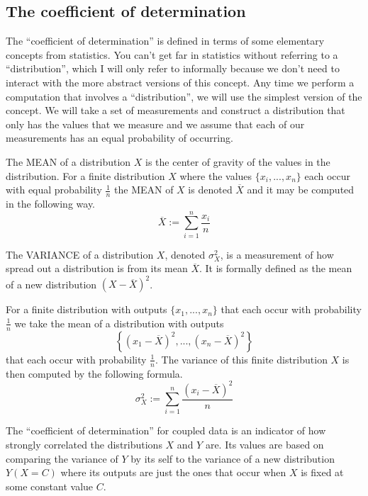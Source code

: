 \subsection{The coefficient of determination}

The ``coefficient of determination'' is defined in terms of some elementary concepts from statistics. You can't get far in statistics without referring to a ``distribution'', which I will only refer to informally because we don't need to interact with the more abstract versions of this concept. Any time we perform a computation that involves a ``distribution'', we will use the simplest version of the concept. We will take a set of measurements and construct a distribution that only has the values that we measure and we assume that each of our measurements has an equal probability of occurring.

\begin{definition}
	The MEAN of a distribution $X$ is the center of gravity of the values in the distribution. For a finite distribution $X$ where the values $\{x_i,...,x_n\}$ each occur with equal probability $\frac{1}{n}$ the MEAN of $X$ is denoted $\overline{X}$ and it may be computed in the following way.
	$$\overline{X}:=\sum_{i=1}^n\frac{x_i}{n}$$
\end{definition}

\begin{definition}
	The VARIANCE of a distribution $X$, denoted $\sigma_X^2$, is a measurement of how spread out a distribution is from its mean $\overline{X}$. It is formally defined as the mean of a new distribution $(X-\overline{X})^2$.
    
    For a finite distribution with outputs $\{x_1,...,x_n\}$ that each occur with probability $\frac{1}{n}$ we take the mean of a distribution with outputs
    $$\left\{(x_1-\overline{X})^2,...,(x_n-\overline{X})^2\right\}$$
    that each occur with probability $\frac{1}{n}$. The variance of this finite distribution $X$ is then computed by the following formula.
	$$\sigma_X^2:=\sum_{i=1}^n\frac{(x_i-\overline{X})^2}{n}$$
\end{definition}

The ``coefficient of determination'' for coupled data is an indicator of how strongly correlated the distributions $X$ and $Y$ are. Its values are based on comparing the variance of $Y$ by its self to the variance of a new distribution $Y(X=C)$ where its outputs are just the ones that occur when $X$ is fixed at some constant value $C$.

